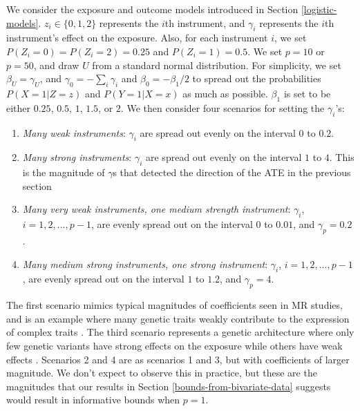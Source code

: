 \documentclass[AMA,STIX1COL,]{WileyNJD-v2}
\begin{document}
We consider the exposure and outcome models introduced in Section
\ref{logistic-models}. \(z_i \in \{0,1,2\}\) represents the \(i\)th
instrument, and \(\gamma_i\) represents the \(i\)th instrument's effect
on the exposure. Also, for each instrument \(i\), we set
\(P(Z_i = 0) = P(Z_i = 2) = 0.25\) and \(P(Z_i = 1) = 0.5\). We set
\(p = 10\) or \(p = 50\), and draw \(U\) from a standard normal
distribution. For simplicity, we set \(\beta_U = \gamma_U\), and
\(\gamma_0 = -\sum_i \gamma_i\) and \(\beta_0 = -\beta_1/2\) to spread
out the probabilities \(P(X = 1 | Z = z)\) and \(P(Y = 1 | X = x)\) as
much as possible. \(\beta_1\) is set to be either \(0.25\), \(0.5\),
\(1\), \(1.5\), or \(2\). We then consider four scenarios for setting
the \(\gamma_i\)'s:

\begin{enumerate}
\item \emph{Many weak instruments}: \(\gamma_i\) are spread out evenly on the interval \(0\) to \(0.2\).
\item \emph{Many strong instruments}: \(\gamma_i\) are spread out evenly on the interval \(1\) to \(4\). This is the magnitude of $\gamma$s that detected the direction of the ATE in the previous section
\item \emph{Many very weak instruments, one medium strength instrument}: $\gamma_i$, $i=1,2,...,p-1$, are evenly spread out on the interval $0$ to $0.01$, and $\gamma_p = 0.2$. 
\item \emph{Many medium strong instruments, one strong instrument}: $\gamma_i$, $i=1,2,...,p-1$, are evenly spread out on the interval $1$ to $1.2$, and $\gamma_p = 4$.
\end{enumerate}

The first scenario mimics typical magnitudes of coefficients seen in MR
studies, and is an example where many genetic traits weakly contribute
to the expression of complex traits
\citep{loh_contrasting_2015, shi_contrasting_2016, nj_genetic_2017}. The
third scenario represents a genetic architecture where only few genetic
variants have strong effects on the exposure while others have weak
effects \citep{yang_common_2010}. Scenarios 2 and 4 are as scenarios 1
and 3, but with coefficients of larger magnitude. We don't expect to
observe this in practice, but these are the magnitudes that our results
in Section \ref{bounds-from-bivariate-data} suggests would result in
informative bounds when \(p = 1\).
\end{document}
